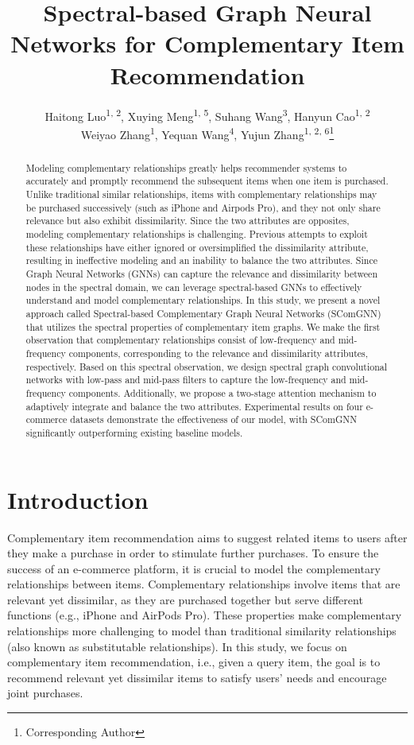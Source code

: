 \documentclass[letterpaper]{article} %
\title{Spectral-based Graph Neural Networks for Complementary Item Recommendation}
\author {
    Haitong Luo\textsuperscript{\rm 1, \rm 2},
    Xuying Meng\textsuperscript{\rm 1, \rm 5},
    Suhang Wang\textsuperscript{\rm 3},
    Hanyun Cao\textsuperscript{\rm 1, \rm 2}\\
    Weiyao Zhang\textsuperscript{\rm 1},
    Yequan Wang\textsuperscript{\rm 4},
    Yujun Zhang\textsuperscript{\rm 1, \rm 2, \rm 6}\thanks{Corresponding Author}
}
\begin{document}
\maketitle

\begin{abstract}
Modeling complementary relationships greatly helps recommender systems to accurately and promptly recommend the subsequent items when one item is purchased. Unlike traditional similar relationships, items with complementary relationships may be purchased successively (such as iPhone and Airpods Pro), and they not only share relevance but also exhibit dissimilarity. Since the two attributes are opposites, modeling complementary relationships is challenging. Previous attempts to exploit these relationships have either ignored or oversimplified the dissimilarity attribute, resulting in ineffective modeling and an inability to balance the two attributes. Since Graph Neural Networks (GNNs) can capture the relevance and dissimilarity between nodes in the spectral domain, we can leverage spectral-based GNNs to effectively understand and model complementary relationships.
In this study, we present a novel approach called Spectral-based Complementary Graph Neural Networks (SComGNN) that utilizes the spectral properties of complementary item graphs. We make the first observation that complementary relationships consist of low-frequency and mid-frequency components, corresponding to the relevance and dissimilarity attributes, respectively. Based on this spectral observation, we design spectral graph convolutional networks with low-pass and mid-pass filters to capture the low-frequency and mid-frequency components. Additionally, we propose a two-stage attention mechanism to adaptively integrate and balance the two attributes. Experimental results on four e-commerce datasets demonstrate the effectiveness of our model, with SComGNN significantly outperforming existing baseline models.




\end{abstract}

\section{Introduction}
Complementary item recommendation \cite{liu2020decoupled, hao2020p, bibas2023semi} aims to suggest related items to users after they make a purchase in order to stimulate further purchases. To ensure the success of an e-commerce platform, it is crucial to model the complementary relationships between items. Complementary relationships involve items that are relevant yet dissimilar, as they are purchased together but serve different functions (e.g., iPhone and AirPods Pro). These properties make complementary relationships more challenging to model than traditional similarity relationships (also known as substitutable relationships). In this study, we focus on complementary item recommendation, i.e., given a query item, the goal is to recommend relevant yet dissimilar items to satisfy users' needs and encourage joint purchases.
\end{document}
